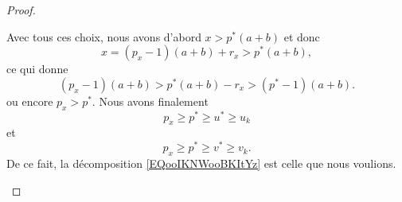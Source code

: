 \begin{proof}
\begin{subproof}
		\spitem[Conclusion]

		Avec tous ces choix, nous avons d'abord \( x>p^*(a+b)\) et donc
		\begin{equation}
			x=(p_x-1)(a+b)+r_x>p^*(a+b),
		\end{equation}
		ce qui donne
		\begin{equation}
			(p_x-1)(a+b)>p^*(a+b)-r_x>(p^*-1)(a+b).
		\end{equation}
		ou encore \( p_x>p^*\). Nous avons finalement
		\begin{equation}
			p_x \geq p^* \geq u^* \geq u_k
		\end{equation}
		et
		\begin{equation}
			p_x \geq p^* \geq v^* \geq v_k.
		\end{equation}
		De ce fait, la décomposition \eqref{EQooIKNWooBKItYz} est celle que nous voulions.
	\end{subproof}
\end{proof}


%
%
%

